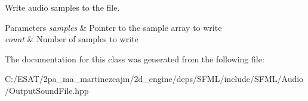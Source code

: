 Write audio samples to the file. 


\begin{DoxyParams}{Parameters}
{\em samples} & Pointer to the sample array to write \\
\hline
{\em count} & Number of samples to write \\
\hline
\end{DoxyParams}


The documentation for this class was generated from the following file\+:\begin{DoxyCompactItemize}
\item 
C\+:/\+E\+S\+A\+T/2pa\+\_\+ma\+\_\+martinezcajm/2d\+\_\+engine/deps/\+S\+F\+M\+L/include/\+S\+F\+M\+L/\+Audio/Output\+Sound\+File.\+hpp\end{DoxyCompactItemize}
